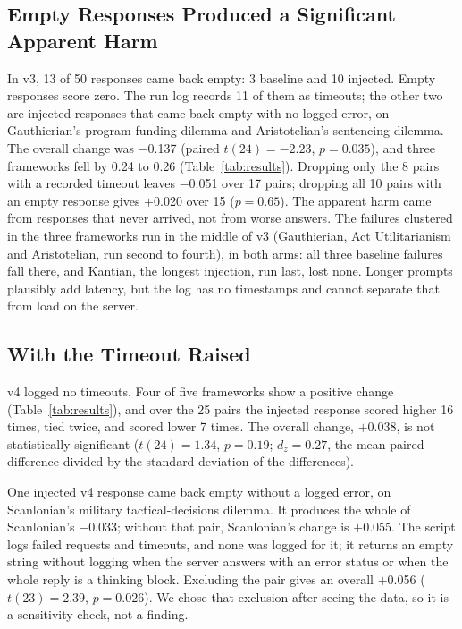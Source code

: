 \documentclass[11pt,a4paper]{article}
\begin{document}
\subsection{Empty Responses Produced a Significant Apparent Harm}
\label{sec:confound}

In v3, 13 of 50 responses came back empty: 3 baseline and 10 injected. Empty responses score zero. The run log records 11 of them as timeouts; the other two are injected responses that came back empty with no logged error, on Gauthierian's program-funding dilemma and Aristotelian's sentencing dilemma. The overall change was $-$0.137 (paired $t(24){=}{-}2.23$, $p{=}0.035$), and three frameworks fell by 0.24 to 0.26 (Table~\ref{tab:results}). Dropping only the 8 pairs with a recorded timeout leaves $-$0.051 over 17 pairs; dropping all 10 pairs with an empty response gives $+$0.020 over 15 ($p{=}0.65$). The apparent harm came from responses that never arrived, not from worse answers. The failures clustered in the three frameworks run in the middle of v3 (Gauthierian, Act Utilitarianism and Aristotelian, run second to fourth), in both arms: all three baseline failures fall there, and Kantian, the longest injection, run last, lost none. Longer prompts plausibly add latency, but the log has no timestamps and cannot separate that from load on the server.

\subsection{With the Timeout Raised}

v4 logged no timeouts. Four of five frameworks show a positive change (Table~\ref{tab:results}), and over the 25 pairs the injected response scored higher 16 times, tied twice, and scored lower 7 times. The overall change, $+$0.038, is not statistically significant ($t(24){=}1.34$, $p{=}0.19$; $d_z{=}0.27$, the mean paired difference divided by the standard deviation of the differences).

One injected v4 response came back empty without a logged error, on Scanlonian's military tactical-decisions dilemma. It produces the whole of Scanlonian's $-$0.033; without that pair, Scanlonian's change is $+$0.055. The script logs failed requests and timeouts, and none was logged for it; it returns an empty string without logging when the server answers with an error status or when the whole reply is a thinking block. Excluding the pair gives an overall $+$0.056 ($t(23){=}2.39$, $p{=}0.026$). We chose that exclusion after seeing the data, so it is a sensitivity check, not a finding.
\end{document}
